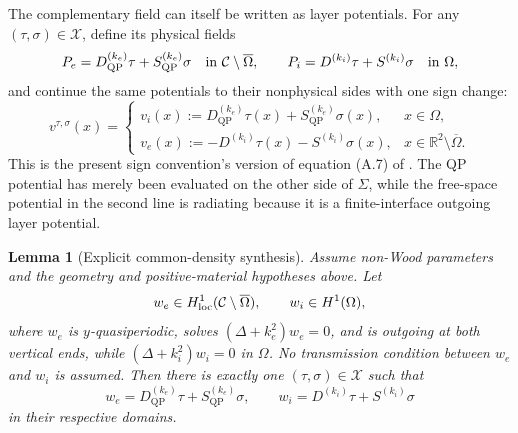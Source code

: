 \documentclass[11pt]{article}
\newcommand{\C}{\mathcal C}
\newcommand{\Om}{\Omega}
\newcommand{\Sig}{\Sigma}
\newcommand{\R}{\mathbb R}
\newcommand{\QP}{\mathrm{QP}}
\theoremstyle{plain}
\newtheorem{lemma}[theorem]{Lemma}
\theoremstyle{definition}
\theoremstyle{remark}
\begin{document}
The complementary field can itself be written as layer potentials.  For any
\((\tau,\sigma)\in\mathcal X\), define its physical fields
\begin{equation}
P_e=D_{\QP}^{(k_e)}\tau+S_{\QP}^{(k_e)}\sigma
\quad\hbox{in }\C\setminus\overline\Om,
\qquad
P_i=D^{(k_i)}\tau+S^{(k_i)}\sigma
\quad\hbox{in }\Om,
\label{eq:physical-potentials}
\end{equation}
and continue the same potentials to their nonphysical sides with one sign
change:
\begin{equation}
v^{\tau,\sigma}(x)=
\begin{cases}
v_i(x):=D_{\QP}^{(k_e)}\tau(x)+S_{\QP}^{(k_e)}\sigma(x),
&x\in\Om,\\
v_e(x):=-D^{(k_i)}\tau(x)-S^{(k_i)}\sigma(x),
&x\in\R^2\setminus\overline\Om.
\end{cases}
\label{eq:complementary-layer}
\end{equation}
This is the present sign convention's version of equation (A.7) of
\cite{BarnettGreengard2010}.  The QP potential has merely been evaluated on
the other side of \(\Sig\), while the free-space potential in the second line
is radiating because it is a finite-interface outgoing layer potential.

\begin{lemma}[Explicit common-density synthesis]
\label{lem:synthesis}
Assume non-Wood parameters and the geometry and positive-material hypotheses
above.  Let
\[
w_e\in H^1_{\rm loc}(\C\setminus\overline\Om),
\qquad w_i\in H^1(\Om),
\]
where \(w_e\) is \(y\)-quasiperiodic, solves
\((\Delta+k_e^2)w_e=0\), and is outgoing at both vertical ends, while
\((\Delta+k_i^2)w_i=0\) in \(\Om\).  No transmission condition between
\(w_e\) and \(w_i\) is assumed.  Then there is exactly one
\((\tau,\sigma)\in\mathcal X\) such that
\begin{equation}
w_e=D_{\QP}^{(k_e)}\tau+S_{\QP}^{(k_e)}\sigma,
\qquad
w_i=D^{(k_i)}\tau+S^{(k_i)}\sigma
\label{eq:synthesis-target}
\end{equation}
in their respective domains.
\end{lemma}
\end{document}
